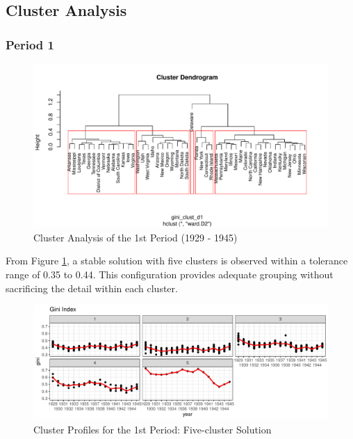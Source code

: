 \documentclass[11pt,a4paper,]{article}
\begin{document}
\newpage

\hypertarget{cluster-analysis}{%
\subsection{Cluster Analysis}\label{cluster-analysis}}

\hypertarget{period-1}{%
\subsubsection{Period 1}\label{period-1}}

\begin{figure}

{\centering \includegraphics{Assignment_2_ETF5500_files/figure-latex/clust-1-dendrogram-1} 

}

\caption{Cluster Analysis of the 1st Period (1929 - 1945)}\label{fig:clust-1-dendrogram}
\end{figure}

From Figure \ref{fig:clust-1-dendrogram}, a stable solution with five clusters is observed within a tolerance range of 0.35 to 0.44. This configuration provides adequate grouping without sacrificing the detail within each cluster.

\begin{figure}
\centering
\includegraphics{Assignment_2_ETF5500_files/figure-latex/cluster-1-1.pdf}
\caption{\label{fig:cluster-1}Cluster Profiles for the 1st Period: Five-cluster Solution}
\end{figure}
\end{document}
